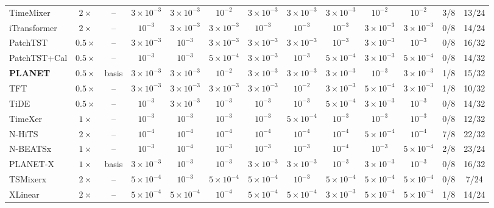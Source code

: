 \begin{table}[!t]
\begin{adjustbox}{max width=\linewidth}
\begin{tabular}{lcccccccccccc}
TimeMixer & $2\times$ & -- & $3\times10^{-3}$ & $3\times10^{-3}$ & $10^{-2}$ & $3\times10^{-3}$ & $3\times10^{-3}$ & $3\times10^{-3}$ & $10^{-2}$ & $10^{-2}$ & 3/8 & 13/24 \\
iTransformer & $2\times$ & -- & $10^{-3}$ & $3\times10^{-3}$ & $3\times10^{-3}$ & $10^{-3}$ & $10^{-3}$ & $10^{-3}$ & $3\times10^{-3}$ & $3\times10^{-3}$ & 0/8 & 14/24 \\
PatchTST & $0.5\times$ & -- & $3\times10^{-3}$ & $10^{-3}$ & $3\times10^{-3}$ & $3\times10^{-3}$ & $3\times10^{-3}$ & $10^{-3}$ & $3\times10^{-3}$ & $10^{-3}$ & 0/8 & 16/32 \\
PatchTST+Cal & $0.5\times$ & -- & $10^{-3}$ & $10^{-3}$ & $5\times10^{-4}$ & $3\times10^{-3}$ & $10^{-3}$ & $5\times10^{-4}$ & $3\times10^{-3}$ & $5\times10^{-4}$ & 0/8 & 14/32 \\
\textbf{PLANET} & $0.5\times$ & basis & $3\times10^{-3}$ & $3\times10^{-3}$ & $10^{-2}$ & $3\times10^{-3}$ & $3\times10^{-3}$ & $3\times10^{-3}$ & $10^{-3}$ & $3\times10^{-3}$ & 1/8 & 15/32 \\
TFT & $0.5\times$ & -- & $3\times10^{-3}$ & $3\times10^{-3}$ & $3\times10^{-3}$ & $3\times10^{-3}$ & $10^{-2}$ & $3\times10^{-3}$ & $5\times10^{-4}$ & $3\times10^{-3}$ & 1/8 & 10/32 \\
TiDE & $0.5\times$ & -- & $10^{-3}$ & $3\times10^{-3}$ & $10^{-3}$ & $10^{-3}$ & $10^{-3}$ & $5\times10^{-4}$ & $3\times10^{-3}$ & $10^{-3}$ & 0/8 & 14/32 \\
TimeXer & $1\times$ & -- & $10^{-3}$ & $10^{-3}$ & $10^{-3}$ & $10^{-3}$ & $5\times10^{-4}$ & $10^{-3}$ & $10^{-3}$ & $10^{-3}$ & 0/8 & 12/32 \\
N-HiTS & $2\times$ & -- & $10^{-4}$ & $10^{-4}$ & $10^{-4}$ & $10^{-4}$ & $10^{-4}$ & $10^{-4}$ & $5\times10^{-4}$ & $10^{-4}$ & 7/8 & 22/32 \\
N-BEATSx & $1\times$ & -- & $10^{-3}$ & $10^{-4}$ & $10^{-3}$ & $10^{-3}$ & $10^{-3}$ & $10^{-4}$ & $10^{-3}$ & $5\times10^{-4}$ & 2/8 & 23/24 \\
PLANET-X & $1\times$ & basis & $3\times10^{-3}$ & $10^{-3}$ & $10^{-3}$ & $3\times10^{-3}$ & $3\times10^{-3}$ & $10^{-3}$ & $3\times10^{-3}$ & $10^{-3}$ & 0/8 & 16/32 \\
TSMixerx & $2\times$ & -- & $5\times10^{-4}$ & $10^{-3}$ & $5\times10^{-4}$ & $5\times10^{-4}$ & $10^{-3}$ & $5\times10^{-4}$ & $5\times10^{-4}$ & $5\times10^{-4}$ & 0/8 & 7/24 \\
XLinear & $2\times$ & -- & $5\times10^{-4}$ & $5\times10^{-4}$ & $10^{-4}$ & $5\times10^{-4}$ & $5\times10^{-4}$ & $3\times10^{-3}$ & $5\times10^{-4}$ & $5\times10^{-4}$ & 1/8 & 14/24 \\
\bottomrule
\end{tabular}
\end{adjustbox}
\end{table}
